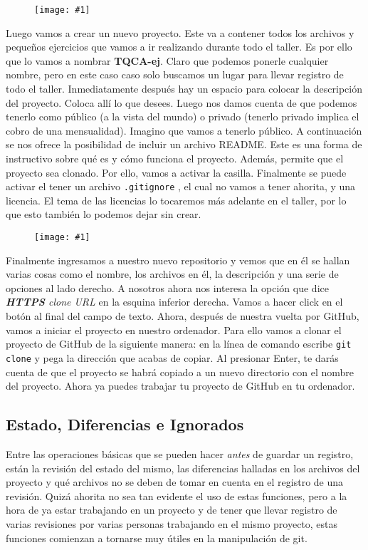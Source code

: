 \documentclass[10pt,letterpaper]{article}
\newcommand{\inlinecode}[1]{
\colorbox{light-gray}{\texttt{#1}}
}
\newcommand{\Picture}[1]
{
	\begin{figure}[H]
	\begin{flushleft}
	\texttt{[image: \#1]}
	\end{flushleft}
	\end{figure}
}
\begin{document}
\Picture{img/github1.png}

Luego vamos a crear un nuevo proyecto. Este va a contener todos los archivos y peque\~nos ejercicios que vamos a ir realizando durante todo el taller. Es por ello que lo vamos a nombrar \textbf{TQCA-ej}. Claro que podemos ponerle cualquier nombre, pero en este caso caso solo buscamos un lugar para llevar registro de todo el taller. Inmediatamente despu\'es hay un espacio para colocar la descripci\'on del proyecto. Coloca all\'i lo que desees. Luego nos damos cuenta de que podemos tenerlo como p\'ublico (a la vista del mundo) o privado (tenerlo privado implica el cobro de una mensualidad). Imagino que vamos a tenerlo p\'ublico. A continuaci\'on se nos ofrece la posibilidad de incluir un archivo README. Este es una forma de instructivo sobre qu\'e es y c\'omo funciona el proyecto. Adem\'as, permite que el proyecto sea clonado. Por ello, vamos a activar la casilla. Finalmente se puede activar el tener un archivo \inlinecode{.gitignore}, el cual no vamos a tener ahorita, y una licencia. El tema de las licencias lo tocaremos m\'as adelante en el taller, por lo que esto tambi\'en lo podemos dejar sin crear.\\

\Picture{img/github2.png}

Finalmente ingresamos a nuestro nuevo repositorio y vemos que en \'el se hallan varias cosas como el nombre, los archivos en \'el, la descripci\'on y una serie de opciones al lado derecho. A nosotros ahora nos interesa la opci\'on que dice \emph{\textbf{HTTPS} clone URL} en la esquina inferior derecha. Vamos a hacer click en el bot\'on al final del campo de texto. Ahora, despu\'es de nuestra vuelta por GitHub, vamos a iniciar el proyecto en nuestro ordenador. Para ello vamos a clonar el proyecto de GitHub de la siguiente manera: en la l\'inea de comando escribe \inlinecode{git clone} y pega la direcci\'on que acabas de copiar. Al presionar Enter, te dar\'as cuenta de que el proyecto se habr\'a copiado a un nuevo directorio con el nombre del proyecto. Ahora ya puedes trabajar tu proyecto de GitHub en tu ordenador.

\subsection{Estado, Diferencias e Ignorados}
Entre las operaciones b\'asicas que se pueden hacer \emph{antes} de guardar un registro, est\'an la revisi\'on del estado del mismo, las diferencias halladas en los archivos del proyecto y qu\'e archivos no se deben de tomar en cuenta en el registro de una revisi\'on. Quiz\'a ahorita no sea tan evidente el uso de estas funciones, pero a la hora de ya estar trabajando en un proyecto y de tener que llevar registro de varias revisiones por varias personas trabajando en el mismo proyecto, estas funciones comienzan a tornarse muy \'utiles en la manipulaci\'on de git.
\end{document}
